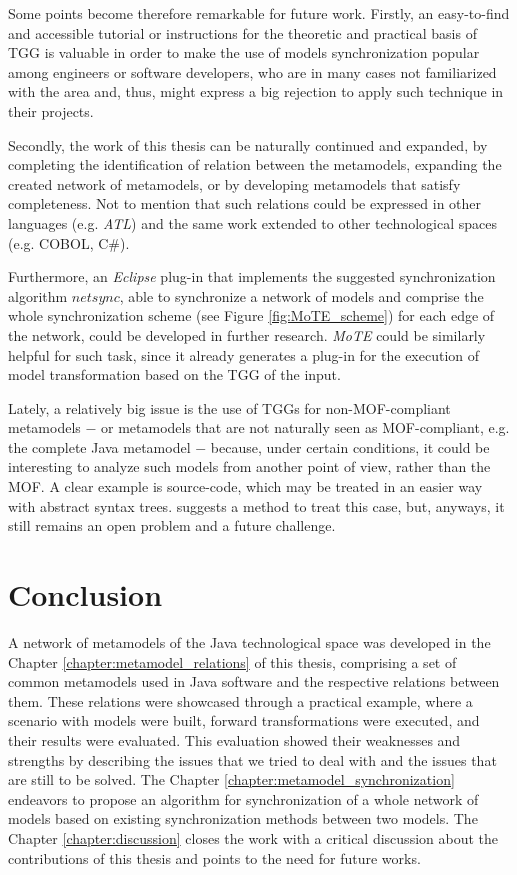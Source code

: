 \documentclass[tuberlin,cic,tc,english,noabntcite,oneside]{iiufrgs}
\begin{document}
Some points become therefore remarkable for future work. Firstly, an easy-to-find and accessible tutorial or instructions for the theoretic and practical basis of TGG is valuable in order to make the use of models synchronization popular among engineers or software developers, who are in many cases not familiarized with the area and, thus, might express a big rejection to apply such technique in their projects.

Secondly, the work of this thesis can be naturally continued and expanded, by completing the identification of relation between the metamodels, expanding the created network of metamodels, or by developing metamodels that satisfy completeness. Not to mention that such relations could be expressed in other languages (e.g. \emph{ATL}) and the same work extended to other technological spaces (e.g. COBOL, C\#).

Furthermore, an \emph{Eclipse} plug-in that implements the suggested synchronization algorithm $netsync$, able to synchronize a network of models and comprise the whole synchronization scheme (see Figure \ref{fig:MoTE_scheme}) for each edge of the network, could be developed in further research. \emph{MoTE} could be similarly helpful for such task, since it already generates a plug-in for the execution of model transformation based on the TGG of the input.

Lately, a relatively big issue is the use of TGGs for non-MOF-compliant metamodels $-$ or metamodels that are not naturally seen as MOF-compliant, e.g. the complete Java metamodel $-$ because, under certain conditions, it could be interesting to analyze such models from another point of view, rather than the MOF. A clear example is source-code, which may be treated in an easier way with abstract syntax trees. \citet{angyal2008novel} suggests a method to treat this case, but, anyways, it still remains an open problem and a future challenge.

\chapter{Conclusion}
A network of metamodels of the Java technological space was developed in the Chapter \ref{chapter:metamodel_relations} of this thesis, comprising a set of common metamodels used in Java software and the respective relations between them. These relations were showcased through a practical example, where a scenario with models were built, forward transformations were executed, and their results were evaluated. This evaluation showed their weaknesses and strengths by describing the issues that we tried to deal with and the issues that are still to be solved. The Chapter \ref{chapter:metamodel_synchronization} endeavors to propose an algorithm for synchronization of a whole network of models based on existing synchronization methods between two models. The Chapter \ref{chapter:discussion} closes the work with a critical discussion about the contributions of this thesis and points to the need for future works.
\end{document}
